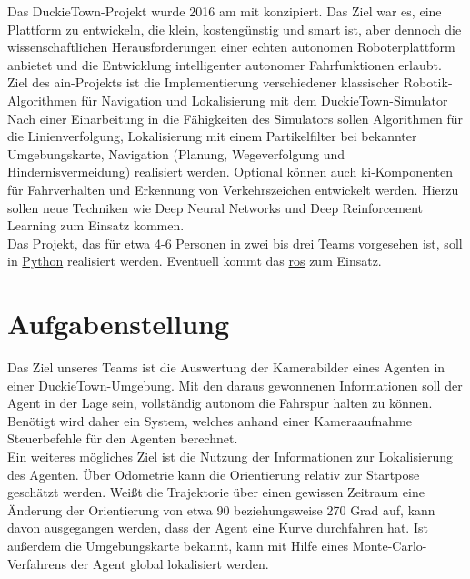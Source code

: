 Das DuckieTown-Projekt wurde 2016 am \acf{mit} konzipiert. Das Ziel war es, eine Plattform zu
entwickeln, die klein, kostengünstig und \grqq smart\grqq{} ist, aber dennoch die wissenschaftlichen
Herausforderungen einer echten autonomen Roboterplattform anbietet und die Entwicklung
intelligenter autonomer Fahrfunktionen erlaubt. \cite{duckietown}\\

\noindent Ziel des \acs{ain}-Projekts ist die Implementierung verschiedener klassischer Robotik-Algorithmen
für Navigation und Lokalisierung mit dem DuckieTown-Simulator\\

\noindent Nach einer Einarbeitung in die Fähigkeiten des Simulators sollen Algorithmen für die
Linienverfolgung, Lokalisierung mit einem Partikelfilter bei bekannter Umgebungskarte,
Navigation (Planung, Wegeverfolgung und Hindernisvermeidung) realisiert werden. Optional können auch \acs{ki}-Komponenten für
Fahrverhalten und Erkennung von Verkehrszeichen entwickelt werden. Hierzu sollen neue
Techniken wie Deep Neural Networks und Deep Reinforcement Learning zum Einsatz
kommen.\\

\noindent Das Projekt, das für etwa 4-6 Personen in zwei bis drei Teams vorgesehen ist, soll in \href{https://www.python.org/}{Python} realisiert werden.
Eventuell kommt das \href{https://www.ros.org/}{\acf{ros}} zum Einsatz.

\newpage

\section{Aufgabenstellung}
\label{aufgabenstellung}

Das Ziel unseres Teams ist die Auswertung der Kamerabilder eines Agenten in einer DuckieTown-Umgebung. Mit den daraus gewonnenen Informationen soll der Agent in der Lage sein, vollständig autonom die Fahrspur halten zu können. Benötigt wird daher ein System, welches anhand einer Kameraaufnahme Steuerbefehle für den Agenten berechnet. \\

Ein weiteres mögliches Ziel ist die Nutzung der Informationen zur Lokalisierung des Agenten. Über Odometrie kann die Orientierung relativ zur Startpose geschätzt werden. Weißt die Trajektorie über einen gewissen Zeitraum eine Änderung der Orientierung von etwa 90 beziehungsweise 270 Grad auf, kann davon ausgegangen werden, dass der Agent eine Kurve durchfahren hat. Ist außerdem die Umgebungskarte bekannt, kann mit Hilfe eines Monte-Carlo-Verfahrens der Agent global lokalisiert werden.\\

